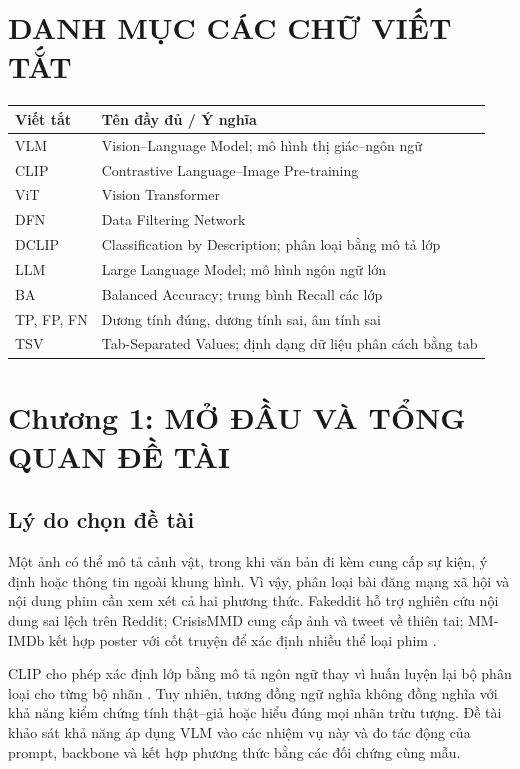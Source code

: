 \documentclass[12pt,a4paper]{article}
\newcommand{\sectioncenter}[1]{%
  \titleformat{\section}{\centering\fontsize{16pt}{20pt}\bfseries}{\thesection}{1em}{}%
  \section*{#1}%
  \titleformat{\section}{\fontsize{16pt}{20pt}\bfseries}{\thesection}{1em}{}}
\begin{document}
\newpage\tableofcontents
\newpage\listoffigures
\newpage\listoftables
\newpage
\sectioncenter{DANH MỤC CÁC CHỮ VIẾT TẮT}
\begin{table}[H]\centering
\begin{tabular}{p{}p{}}\toprule
\textbf{Viết tắt}&\textbf{Tên đầy đủ / Ý nghĩa}\\\midrule
VLM&Vision--Language Model; mô hình thị giác--ngôn ngữ\\
CLIP&Contrastive Language--Image Pre-training\\
ViT&Vision Transformer\\
DFN&Data Filtering Network\\
DCLIP&Classification by Description; phân loại bằng mô tả lớp\\
LLM&Large Language Model; mô hình ngôn ngữ lớn\\
BA&Balanced Accuracy; trung bình Recall các lớp\\
TP, FP, FN&Dương tính đúng, dương tính sai, âm tính sai\\
TSV&Tab-Separated Values; định dạng dữ liệu phân cách bằng tab\\\bottomrule
\end{tabular}\end{table}
\titleformat{\section}{\fontsize{16pt}{20pt}\bfseries}{}{0pt}{}

\newpage
\section{Chương 1: MỞ ĐẦU VÀ TỔNG QUAN ĐỀ TÀI}
\subsection{Lý do chọn đề tài}
Một ảnh có thể mô tả cảnh vật, trong khi văn bản đi kèm cung cấp sự kiện, ý định hoặc thông tin ngoài khung hình. Vì vậy, phân loại bài đăng mạng xã hội và nội dung phim cần xem xét cả hai phương thức. Fakeddit hỗ trợ nghiên cứu nội dung sai lệch trên Reddit; CrisisMMD cung cấp ảnh và tweet về thiên tai; MM-IMDb kết hợp poster với cốt truyện để xác định nhiều thể loại phim \cite{fakeddit,crisismmd,mmimdb}.

CLIP cho phép xác định lớp bằng mô tả ngôn ngữ thay vì huấn luyện lại bộ phân loại cho từng bộ nhãn \cite{clip}. Tuy nhiên, tương đồng ngữ nghĩa không đồng nghĩa với khả năng kiểm chứng tính thật--giả hoặc hiểu đúng mọi nhãn trừu tượng. Đề tài khảo sát khả năng áp dụng VLM vào các nhiệm vụ này và đo tác động của prompt, backbone và kết hợp phương thức bằng các đối chứng cùng mẫu.
\end{document}

